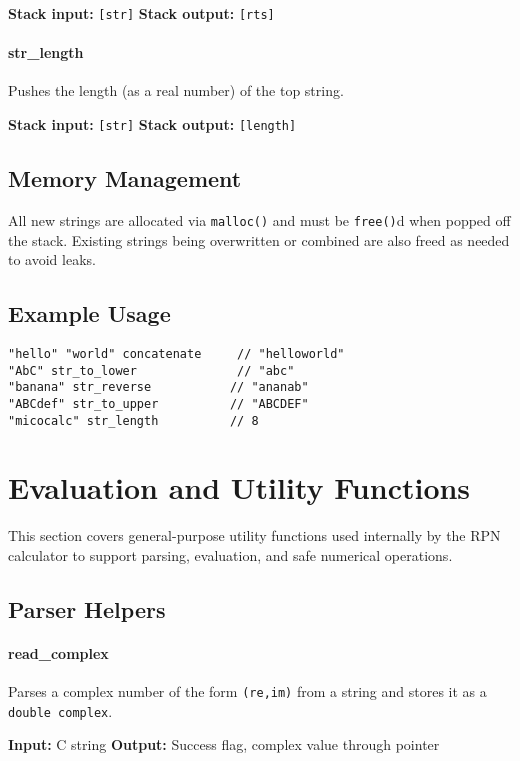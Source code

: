 \documentclass[12pt]{article}
\begin{document}
\textbf{Stack input:} \texttt{[str]}  
\textbf{Stack output:} \texttt{[rts]}

\paragraph{str\_length}
Pushes the length (as a real number) of the top string.

\textbf{Stack input:} \texttt{[str]}  
\textbf{Stack output:} \texttt{[length]}

\subsection{Memory Management}

All new strings are allocated via \texttt{malloc()} and must be \texttt{free()}d when popped off the stack. Existing strings being overwritten or combined are also freed as needed to avoid leaks.

\subsection{Example Usage}

\begin{verbatim}
"hello" "world" concatenate     // "helloworld"
"AbC" str_to_lower              // "abc"
"banana" str_reverse           // "ananab"
"ABCdef" str_to_upper          // "ABCDEF"
"micocalc" str_length          // 8
\end{verbatim}

\section{Evaluation and Utility Functions}

This section covers general-purpose utility functions used internally by the RPN calculator to support parsing, evaluation, and safe numerical operations.

\subsection{Parser Helpers}

\paragraph{read\_complex}
Parses a complex number of the form \texttt{(re,im)} from a string and stores it as a \texttt{double complex}.

\textbf{Input:} C string  
\textbf{Output:} Success flag, complex value through pointer
\end{document}
